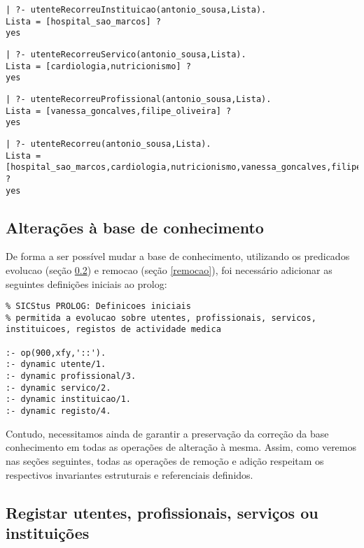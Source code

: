 \documentclass[
  oneside,
  10pt, a4paper,
  footinclude=true,
  headinclude=true,
  cleardoublepage=empty
]{scrbook}
\begin{document}
\begin{lstlisting}
| ?- utenteRecorreuInstituicao(antonio_sousa,Lista).
Lista = [hospital_sao_marcos] ? 
yes
\end{lstlisting}

\begin{lstlisting}
| ?- utenteRecorreuServico(antonio_sousa,Lista).
Lista = [cardiologia,nutricionismo] ? 
yes
\end{lstlisting}

\begin{lstlisting}
| ?- utenteRecorreuProfissional(antonio_sousa,Lista).
Lista = [vanessa_goncalves,filipe_oliveira] ? 
yes
\end{lstlisting}

\begin{lstlisting}
| ?- utenteRecorreu(antonio_sousa,Lista).
Lista = [hospital_sao_marcos,cardiologia,nutricionismo,vanessa_goncalves,filipe_oliveira] ? 
yes
\end{lstlisting}



\subsection{Alterações à base de conhecimento}
\label{base_conhecimento}
De forma a ser possível mudar a base de conhecimento, utilizando os predicados evolucao (seção \ref{evolucao}) e remocao (seção \ref{remocao}), foi necessário adicionar as seguintes definições iniciais ao prolog:
\begin{lstlisting}
% SICStus PROLOG: Definicoes iniciais
% permitida a evolucao sobre utentes, profissionais, servicos, instituicoes, registos de actividade medica

:- op(900,xfy,'::').
:- dynamic utente/1.
:- dynamic profissional/3.
:- dynamic servico/2.
:- dynamic instituicao/1.
:- dynamic registo/4.
\end{lstlisting}

Contudo, necessitamos ainda de garantir a preservação da correção da base conhecimento em todas as operações de alteração à mesma. Assim, como veremos nas seções seguintes, todas as operações de remoção e adição respeitam os respectivos invariantes estruturais e referenciais definidos.

\subsection{Registar utentes, profissionais, serviços ou instituições}
\label{evolucao}
\end{document}
